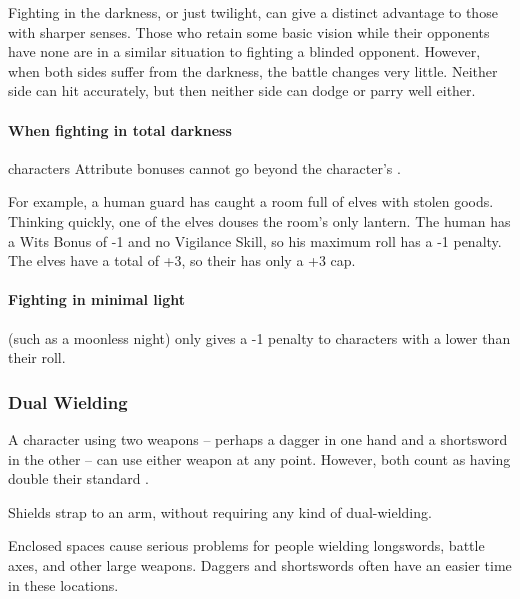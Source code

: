 \begin{multicols}{2}
Fighting in the darkness, or just twilight, can give a distinct advantage to those with sharper senses.
Those who retain some basic vision while their opponents have none are in a similar situation to fighting a blinded opponent.
However, when both sides suffer from the darkness, the battle changes very little.
Neither side can hit accurately, but then neither side can dodge or parry well either.

\paragraph*{When fighting in total darkness}
characters Attribute bonuses cannot go beyond the character's .

\begin{exampletext}
  For example, a human guard has caught a room full of elves with stolen goods.
  Thinking quickly, one of the elves douses the room's only lantern.
  The human has a Wits Bonus of -1 and no Vigilance Skill, so his maximum roll has a -1 penalty.
  The elves have a total  of +3, so their  has only a +3 cap.
\end{exampletext}

\paragraph*{Fighting in minimal light}
(such as a moonless night)
only gives a -1 penalty to characters with a  lower than their roll.

\subsubsection[Dual Wielding: Both weapons count has having +1 \glsentrytext{weight}]{Dual Wielding}

A character using two weapons -- perhaps a dagger in one hand and a shortsword in the other -- can use either weapon at any point.
However, both count as having double their standard .

Shields strap to an arm, without requiring any kind of dual-wielding.


Enclosed spaces cause serious problems for people wielding longswords, battle axes, and other large weapons.
Daggers and shortswords often have an easier time in these locations.


\end{multicols}
